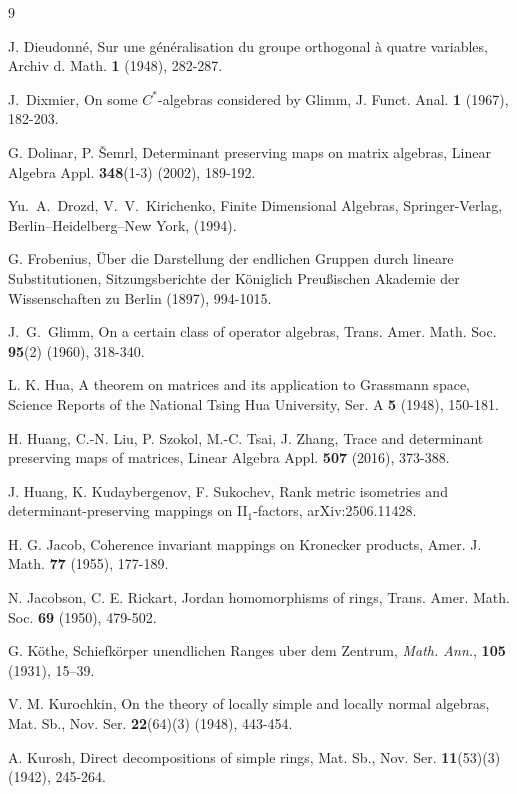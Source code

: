 \documentclass[12pt]{amsart}
\begin{document}
{\begin{thebibliography}{9}
					

		 J. Dieudonné, Sur une généralisation du groupe orthogonal à quatre variables, Archiv d. Math. \textbf{1} (1948), 282-287.
	
	 J.~Dixmier, On some $C^{*}$-algebras considered by Glimm,  J. Funct. Anal. \textbf{1} (1967), 182-203.

	G. Dolinar, P. Šemrl, Determinant preserving maps on matrix algebras, Linear Algebra Appl. \textbf{348}(1-3) (2002), 189-192.

			
Yu.~A.~Drozd, V.~V.~Kirichenko, Finite Dimensional Algebras, Springer-Verlag, Berlin--Heidelberg--New York, (1994).
			
			G. Frobenius, Über die Darstellung der endlichen Gruppen durch lineare Substitutionen, Sitzungsberichte der Königlich Preußischen Akademie der Wissenschaften zu Berlin (1897), 994-1015.

 J.~G.~Glimm,   On a certain class of operator algebras, Trans. Amer. Math. Soc. {\bf 95}(2) (1960), 318-340.


	L. K. Hua, A theorem on matrices and its application to Grassmann space, Science Reports of the National Tsing Hua University, Ser. A \textbf{5} (1948), 150-181.


			H. Huang, C.-N. Liu, P. Szokol, M.-C. Tsai, J. Zhang, 		Trace and determinant preserving maps of matrices, Linear Algebra Appl. \textbf{507} (2016), 373-388.


	J. Huang, K. Kudaybergenov, F. Sukochev, Rank metric isometries and determinant-preserving mappings on II$_1$-factors, 	arXiv:2506.11428.

 H. G. Jacob, Coherence invariant mappings on Kronecker products, Amer. J. Math. \textbf{77} (1955), 177-189.

 N. Jacobson,  C. E. Rickart, Jordan homomorphisms of rings,	Trans. Amer. Math. Soc. \textbf{69} (1950),  479-502.

			
 G. K\"{o}the, Schiefk\"{o}rper unendlichen Ranges uber dem Zentrum, \emph{Math. Ann.}, \textbf{105} (1931), 15--39.

 V. M. Kurochkin, On the theory of locally simple and locally normal algebras, Mat. Sb., Nov. Ser. \textbf{22}(64)(3) (1948), 443-454.

 A. Kurosh, Direct decompositions of simple rings, 	Mat. Sb., Nov. Ser. {\bf 11}(53)(3) (1942), 245-264.



\end{thebibliography}}
\end{document}
